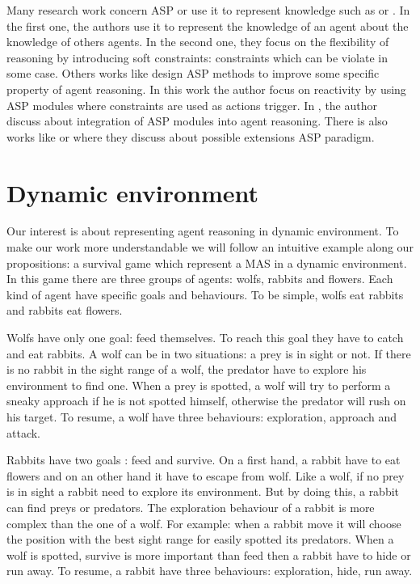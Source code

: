 \documentclass{aamas2012}
\begin{document}
	Many research work concern ASP or use it to represent knowledge such as \cite{DBLP:conf/atal/BaralGSP10} or \cite{DBLP:conf/clima/NieuwenborghVHV06}.
	In the first one, the authors use it to represent the knowledge of an agent about the knowledge of others agents.
	In the second one, they focus on the flexibility of reasoning by introducing soft constraints: constraints which can be violate in some case.
	Others works like \cite{DBLP:conf/datalog/Costantini10} design ASP methods to improve some specific property of agent reasoning.
	In this work the author focus on reactivity by using ASP modules where constraints are used as actions trigger.
	In \cite{DBLP:conf/lpnmr/Costantini09}, the author discuss about integration of ASP modules into agent reasoning.
	There is also works like \cite{DBLP:conf/aaaiss/BaralAD06} or \cite{DBLP:conf/birthday/FaberW11} where they discuss about possible extensions ASP paradigm.
	

\section{Dynamic environment}

	Our interest is about representing agent reasoning in dynamic environment.
	To make our work more understandable we will follow an intuitive example along our propositions: a survival game which represent a MAS in a dynamic environment.
	In this game there are three groups of agents: wolfs, rabbits and flowers.
	Each kind of agent have specific goals and behaviours.
	To be simple, wolfs eat rabbits and rabbits eat flowers.
	
	Wolfs have only one goal: feed themselves.
	To reach this goal they have to catch and eat rabbits.
	A wolf can be in two situations: a prey is in sight or not.
	If there is no rabbit in the sight range of a wolf, the predator have to explore his environment to find one.
	When a prey is spotted, a wolf will try to perform a sneaky approach if he is not spotted himself, otherwise the predator will rush on his target.
	To resume, a wolf have three behaviours: exploration, approach and attack.
	
	Rabbits have two goals : feed and survive.
	On a first hand, a rabbit have to eat flowers and on an other hand it have to escape from wolf.
	Like a wolf, if no prey is in sight a rabbit need to explore its environment.
	But by doing this, a rabbit can find preys or predators.
	The exploration behaviour of a rabbit is more complex than the one of a wolf.
	For example: when a rabbit move it will choose the position with the best sight range for easily spotted its predators.
	When a wolf is spotted, survive is more important than feed then a rabbit have to hide or run away.
	To resume, a rabbit have three behaviours: exploration, hide, run away.
	
\end{document}
